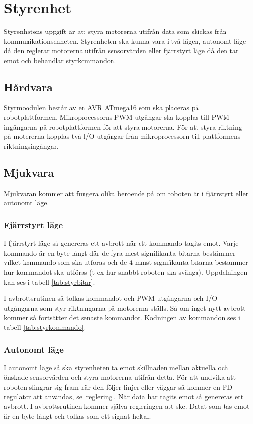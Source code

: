 \section{Styrenhet}
Styrenhetens uppgift är att styra motorerna utifrån data som skickas från kommunikationsenheten.
Styrenheten ska kunna vara i två lägen, autonomt läge då den reglerar motorerna utifrån sensorvärden eller 
fjärrstyrt läge då den tar emot och behandlar styrkommandon.
\subsection{Hårdvara}
Styrmoodulen består av en AVR ATmega16 som ska placeras på robotplattformen.
Mikroprocessorns PWM-utgångar ska kopplas till PWM-ingångarna på robotplattformen för att styra motorerna.
För att styra riktning på motorerna kopplas två I/O-utgångar från mikroprocessorn till plattformens riktningsingångar.
\subsection{Mjukvara}
Mjukvaran kommer att fungera olika beroende på om roboten är i fjärrstyrt eller autonomt läge.
\subsubsection{Fjärrstyrt läge}
I fjärrstyrt läge så genereras ett avbrott när ett kommando tagits emot.
Varje kommando är en byte långt där de fyra mest signifikanta bitarna bestämmer vilket kommando som ska utföras
och de 4 minst signifikanta bitarna bestämmer hur kommandot ska utföras (t ex hur snabbt roboten ska svänga).
Uppdelningen kan ses i tabell \ref{tab:styrbitar}.

I avbrottsrutinen så tolkas kommandot och PWM-utgångarna och I/O-utgångarna som styr riktningarna på motorerna ställs.
Så om inget nytt avbrott kommer så fortsätter det senaste kommandot.
Kodningen av kommandon ses i tabell \ref{tab:styrkommando}.


\subsubsection{Autonomt läge}
I autonomt läge så ska styrenheten ta emot skillnaden mellan aktuella och önskade sensorvärden och styra motorerna utifrån detta.
För att undvika att roboten slingrar sig fram när den följer linjer eller 
väggar så kommer en PD-regulator att användas, se \ref{reglering}.
När data har tagits emot så genereras ett avbrott. 
I avbrottsrutinen kommer själva regleringen att ske. Datat som tas emot är en byte långt 
och tolkas som ett signat heltal. 

